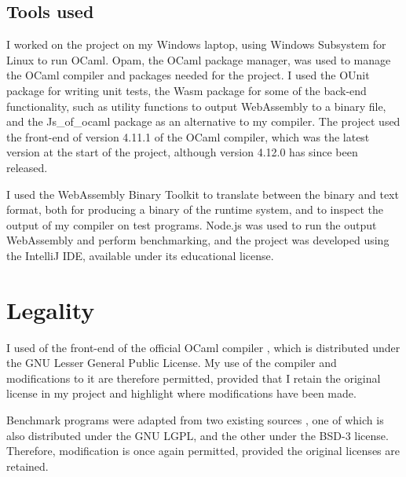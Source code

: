 \subsection{Tools used} %
I worked on the project on my Windows laptop, using Windows Subsystem for Linux to run OCaml. Opam, the OCaml package manager, was used to manage the 
OCaml compiler and packages needed for the project. I used the OUnit package for writing unit tests, the Wasm package for some of the back-end functionality, such as %
utility functions to output WebAssembly to a binary file, and the Js\_of\_ocaml package as an alternative to my compiler. The project used the front-end of version 4.11.1 of the OCaml compiler, which was the latest version at the start of the project, although version 4.12.0 has since been released. 


I used the WebAssembly Binary Toolkit to translate between the binary and text format, both for producing a binary of the runtime system, and to inspect the output of my compiler on test programs. Node.js was used to run the output WebAssembly and perform benchmarking, and the project was developed using the IntelliJ IDE, available under its educational license.


\section{Legality}
I used of the front-end of the official OCaml compiler \cite{ocaml}, which is distributed under the GNU Lesser General Public License. My use of the compiler and modifications to it are therefore permitted, provided that I retain the original license in my project and highlight where modifications have been made. 

Benchmark programs were adapted from two existing sources \cite{chris00, benchmark-game}, one of which is also distributed under the GNU LGPL, and the other under the BSD-3 license. Therefore, modification is once again permitted, provided the original licenses are retained.



